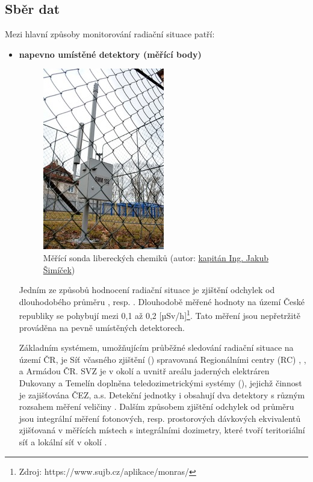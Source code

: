 

\subsection{Sběr dat}	

Mezi hlavní způsoby monitorování radiační situace patří:

\begin{itemize}
	\item \textbf{napevno umístěné detektory (měřící body)}
	
\begin{figure}[H]
    \centering
      \includegraphics[width=150pt]{./pictures/03_merici-sonda-v-libereckych-kasarnach_2.jpg}
      \caption[Měřící sonda libereckých chemiků]{Měřící sonda libereckých chemiků
      (autor: \href{http://www.acr.army.cz/informacni-servis/zpravodajstvi/armadni-radiacni-monitorovaci-site-nacvicoval-zasah-pri-radiaci-131355/}{kapitán Ing. Jakub Šimíček})}
      \label{fig:sonda}
\end{figure}
	
	Jedním ze způsobů hodnocení radiační situace je zjištění odchylek od dlouhodobého průměru , resp. . Dlouhodobě měřené hodnoty  na území České republiky se pohybují mezi 0,1 až 0,2 {[}µSv/h{]}\footnote{Zdroj: https://www.sujb.cz/aplikace/monras/}. Tato měření jsou nepřetržitě prováděna na pevně umístěných detektorech.
	
	Základním systémem, umožňujícím průběžné sledování radiační situace na území ČR, je Síť včasného zjištění () spravovaná Regionálními centry (RC) , ,  a Armádou ČR. SVZ je v okolí a uvnitř areálu jaderných elektráren Dukovany a Temelín doplněna teledozimetrickými systémy (), jejichž činnost je zajišťována ČEZ, a.s. Detekční jednotky  i  obsahují dva detektory s různým rozsahem měření veličiny . Dalším způsobem zjištění odchylek od průměru jsou integrální měření fotonových, resp. prostorových dávkových ekvivalentů zjišťovaná v měřících místech s integrálními dozimetry, které tvoří teritoriální síť a lokální síť v okolí .
	

\end{itemize}
